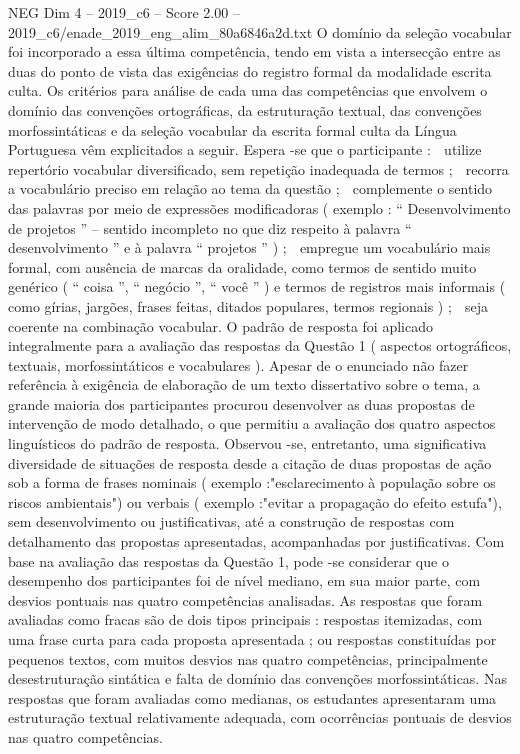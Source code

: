 \begin{textsample}{NEG Dim 4 – 2019\_c6 – Score 2.00 – 2019\_c6/enade\_2019\_eng\_alim\_80a6846a2d.txt}
O domínio da seleção vocabular foi incorporado a essa última competência, tendo em vista a intersecção entre as duas do ponto de vista das exigências do registro formal da modalidade escrita culta.
Os critérios para análise de cada uma das competências que envolvem o domínio das convenções ortográficas, da estruturação textual, das convenções morfossintáticas e da seleção vocabular da escrita formal culta da Língua Portuguesa vêm explicitados a seguir.
Espera -se que o participante :  utilize repertório vocabular diversificado, sem repetição inadequada de termos ;  recorra a vocabulário preciso em relação ao tema da questão ;  complemente o sentido das palavras por meio de expressões modificadoras ( exemplo : “ Desenvolvimento de projetos ” – sentido incompleto no que diz respeito à palavra “ desenvolvimento ” e à palavra “ projetos ” ) ;  empregue um vocabulário mais formal, com ausência de marcas da oralidade, como termos de sentido muito genérico ( “ coisa ”, “ negócio ”, “ você ” ) e termos de registros mais informais ( como gírias, jargões, frases feitas, ditados populares, termos regionais ) ;  seja coerente na combinação vocabular.
O padrão de resposta foi aplicado integralmente para a avaliação das respostas da Questão 1 ( aspectos ortográficos, textuais, morfossintáticos e vocabulares ).
Apesar de o enunciado não fazer referência à exigência de elaboração de um texto dissertativo sobre o tema, a grande maioria dos participantes procurou desenvolver as duas propostas de intervenção de modo detalhado, o que permitiu a avaliação dos quatro aspectos linguísticos do padrão de resposta.
Observou -se, entretanto, uma significativa diversidade de situações de resposta desde a citação de duas propostas de ação sob a forma de frases nominais ( exemplo :"esclarecimento à população sobre os riscos ambientais") ou verbais ( exemplo :"evitar a propagação do efeito estufa"), sem desenvolvimento ou justificativas, até a construção de respostas com detalhamento das propostas apresentadas, acompanhadas por justificativas.
Com base na avaliação das respostas da Questão 1, pode -se considerar que o desempenho dos participantes foi de nível mediano, em sua maior parte, com desvios pontuais nas quatro competências analisadas.
As respostas que foram avaliadas como fracas são de dois tipos principais : respostas itemizadas, com uma frase curta para cada proposta apresentada ; ou respostas constituídas por pequenos textos, com muitos desvios nas quatro competências, principalmente desestruturação sintática e falta de domínio das convenções morfossintáticas.
Nas respostas que foram avaliadas como medianas, os estudantes apresentaram uma estruturação textual relativamente adequada, com ocorrências pontuais de desvios nas quatro competências.

\end{textsample}
